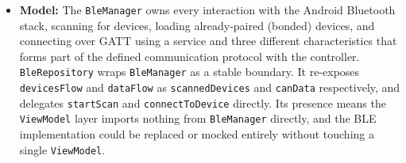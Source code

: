 \begin{itemize}
    \item \textbf{Model:} The \texttt{BleManager} owns every interaction with the Android Bluetooth stack, scanning for devices, loading already-paired (bonded) devices, and connecting over GATT using a service and three different characteristics that forms part of the defined communication protocol with the controller. \texttt{BleRepository} wraps \texttt{BleManager} as a stable boundary. It re-exposes \texttt{devicesFlow} and \texttt{dataFlow} as \texttt{scannedDevices} and \texttt{canData} respectively, and delegates \texttt{startScan} and \texttt{connectToDevice} directly. Its presence means the \texttt{ViewModel} layer imports nothing from \texttt{BleManager} directly, and the BLE implementation could be replaced or mocked entirely without touching a single \texttt{ViewModel}.
\end{itemize}
